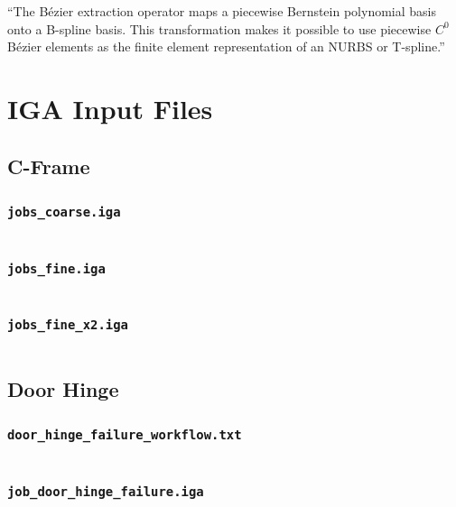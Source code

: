 \documentclass[12pt,report,justified]{SANDreport}
\begin{document}
``The B{\'e}zier extraction operator maps a piecewise Bernstein polynomial basis onto a B-spline basis.  This transformation makes it possible to use piecewise $C^0$ B{\'e}zier elements as the finite element representation of an NURBS or T-spline.''


\chapter{IGA Input Files}

\section{C-Frame}

\subsection{\tt{jobs\_coarse.iga}}
\inputminted[stripnl=false]{json}{cframe_modal/jobs_coarse.json}

\subsection{\tt{jobs\_fine.iga}}
\inputminted[stripnl=false]{json}{cframe_modal/jobs_fine.json}

\subsection{\tt{jobs\_fine\_x2.iga}}
\inputminted[stripnl=false]{json}{cframe_modal/jobs_fine_x2.json}

\section{Door Hinge}

\subsection{\tt{door\_hinge\_failure\_workflow.txt}}
\inputminted[stripnl=false]{text}{door_hinge/door_hinge_failure_workflow.txt}

\subsection{\tt{job\_door\_hinge\_failure.iga}}
\inputminted[stripnl=false]{json}{door_hinge/job_door_hinge_failure.json}
\end{document}
